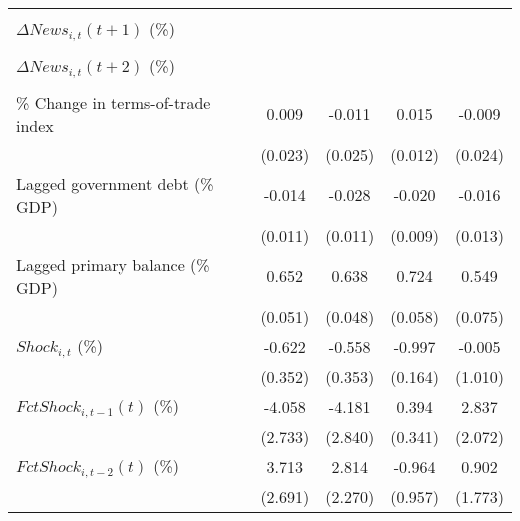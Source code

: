{\begin{tabular}{l*{4}{c}}
                    &                     &                     &                     &                     \\
\addlinespace
$ \Delta News_{i,t}(t+1)$ (\%)&                     &                     &                     &                     \\
                    &                     &                     &                     &                     \\
\addlinespace
$ \Delta News_{i,t}(t+2)$ (\%)&                     &                     &                     &                     \\
                    &                     &                     &                     &                     \\
\addlinespace
\% Change in terms-of-trade index&       0.009         &      -0.011         &       0.015         &      -0.009         \\
                    &     (0.023)         &     (0.025)         &     (0.012)         &     (0.024)         \\
\addlinespace
Lagged government debt (\% GDP)&      -0.014         &      -0.028\sym{**} &      -0.020\sym{**} &      -0.016         \\
                    &     (0.011)         &     (0.011)         &     (0.009)         &     (0.013)         \\
\addlinespace
Lagged primary balance (\% GDP)&       0.652\sym{***}&       0.638\sym{***}&       0.724\sym{***}&       0.549\sym{***}\\
                    &     (0.051)         &     (0.048)         &     (0.058)         &     (0.075)         \\
\addlinespace
$ Shock_{i,t}$ (\%) &      -0.622         &      -0.558         &      -0.997\sym{***}&      -0.005         \\
                    &     (0.352)         &     (0.353)         &     (0.164)         &     (1.010)         \\
\addlinespace
$ FctShock_{i,t-1}(t)$ (\%)&      -4.058         &      -4.181         &       0.394         &       2.837         \\
                    &     (2.733)         &     (2.840)         &     (0.341)         &     (2.072)         \\
\addlinespace
$ FctShock_{i,t-2}(t)$ (\%)&       3.713         &       2.814         &      -0.964         &       0.902         \\
                    &     (2.691)         &     (2.270)         &     (0.957)         &     (1.773)         \\

\end{tabular}}
